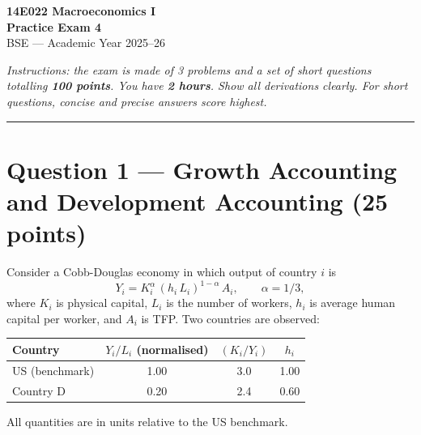 \documentclass[a4paper,11pt]{article}
\begin{document}

\begin{center}
    {\LARGE \textbf{14E022 Macroeconomics I}}\\[6pt]
    {\Large \textbf{Practice Exam 4}}\\[8pt]
    {\large BSE --- Academic Year 2025--26}
\end{center}

\vspace{8pt}
\noindent\textit{Instructions: the exam is made of 3 problems and a set of short questions totalling \textbf{100 points}.
You have \textbf{2 hours}. Show all derivations clearly. For short questions, concise and precise answers score highest.}
\vspace{4pt}

\noindent\rule{\textwidth}{0.4pt}

\section{Question 1 --- Growth Accounting and Development Accounting \hfill (25 points)}

Consider a Cobb-Douglas economy in which output of country $i$ is
\[
    Y_i = K_i^{\alpha}\,(h_i\,L_i)^{1-\alpha}\,A_i,
    \qquad \alpha = 1/3,
\]
where $K_i$ is physical capital, $L_i$ is the number of workers, $h_i$ is average human capital
per worker, and $A_i$ is TFP.  Two countries are observed:

\vspace{6pt}
\begin{center}
\begin{tabular}{lccc}
\toprule
Country & $Y_i/L_i$ (normalised) & $(K_i/Y_i)$ & $h_i$ \\
\midrule
US (benchmark) & 1.00 & 3.0 & 1.00 \\
Country D      & 0.20 & 2.4 & 0.60 \\
\bottomrule
\end{tabular}
\end{center}
\vspace{6pt}

\noindent All quantities are in units relative to the US benchmark.
\end{document}

